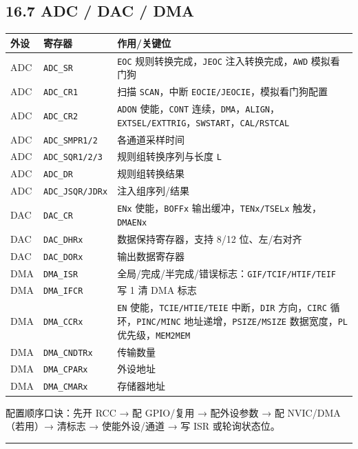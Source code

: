 \documentclass[UTF8,zihao=-5]{ctexart}
\renewcommand{\arraystretch}{0.9}
\begin{document}
\begin{multicols*}{2}
\subsection*{16.7 ADC / DAC / DMA}
{\scriptsize\setlength{\tabcolsep}{1.8pt}\renewcommand{\arraystretch}{0.88}%
\begin{tabularx}{\linewidth}{@{}*{3}{Y}@{}}
\toprule
\textbf{外设} & \textbf{寄存器} & \textbf{作用/关键位} \\
\midrule
ADC & \texttt{ADC\_SR} & \texttt{EOC} 规则转换完成，\texttt{JEOC} 注入转换完成，\texttt{AWD} 模拟看门狗 \\
ADC & \texttt{ADC\_CR1} & 扫描 \texttt{SCAN}，中断 \texttt{EOCIE/JEOCIE}，模拟看门狗配置 \\
ADC & \texttt{ADC\_CR2} & \texttt{ADON} 使能，\texttt{CONT} 连续，\texttt{DMA}，\texttt{ALIGN}，\texttt{EXTSEL/EXTTRIG}，\texttt{SWSTART}，\texttt{CAL/RSTCAL} \\
ADC & \texttt{ADC\_SMPR1/2} & 各通道采样时间 \\
ADC & \texttt{ADC\_SQR1/2/3} & 规则组转换序列与长度 \texttt{L} \\
ADC & \texttt{ADC\_DR} & 规则组转换结果 \\
ADC & \texttt{ADC\_JSQR/JDRx} & 注入组序列/结果 \\
DAC & \texttt{DAC\_CR} & \texttt{ENx} 使能，\texttt{BOFFx} 输出缓冲，\texttt{TENx/TSELx} 触发，\texttt{DMAENx} \\
DAC & \texttt{DAC\_DHRx} & 数据保持寄存器，支持 8/12 位、左/右对齐 \\
DAC & \texttt{DAC\_DORx} & 输出数据寄存器 \\
DMA & \texttt{DMA\_ISR} & 全局/完成/半完成/错误标志：\texttt{GIF/TCIF/HTIF/TEIF} \\
DMA & \texttt{DMA\_IFCR} & 写 1 清 DMA 标志 \\
DMA & \texttt{DMA\_CCRx} & \texttt{EN} 使能，\texttt{TCIE/HTIE/TEIE} 中断，\texttt{DIR} 方向，\texttt{CIRC} 循环，\texttt{PINC/MINC} 地址递增，\texttt{PSIZE/MSIZE} 数据宽度，\texttt{PL} 优先级，\texttt{MEM2MEM} \\
DMA & \texttt{DMA\_CNDTRx} & 传输数量 \\
DMA & \texttt{DMA\_CPARx} & 外设地址 \\
DMA & \texttt{DMA\_CMARx} & 存储器地址 \\
\bottomrule
\end{tabularx}}
配置顺序口诀：先开 RCC → 配 GPIO/复用 → 配外设参数 → 配 NVIC/DMA（若用）→ 清标志 → 使能外设/通道 → 写 ISR 或轮询状态位。\par
\vspace{1pt}\hrule\vspace{1pt}

\end{multicols*}
\end{document}
